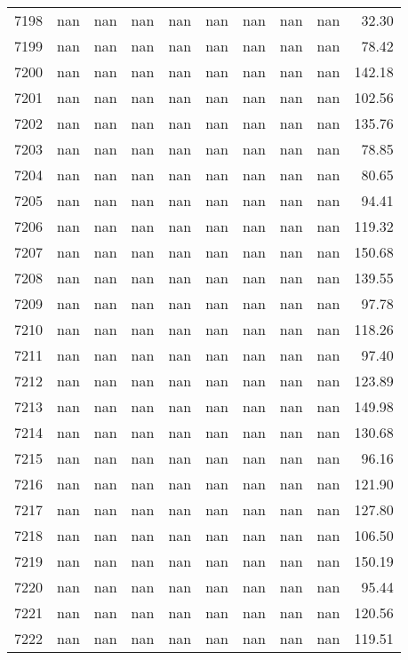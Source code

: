\begin{tabular}{lrrrrrrrrr}
7198 & nan & nan & nan & nan & nan & nan & nan & nan & 32.30 \\
7199 & nan & nan & nan & nan & nan & nan & nan & nan & 78.42 \\
7200 & nan & nan & nan & nan & nan & nan & nan & nan & 142.18 \\
7201 & nan & nan & nan & nan & nan & nan & nan & nan & 102.56 \\
7202 & nan & nan & nan & nan & nan & nan & nan & nan & 135.76 \\
7203 & nan & nan & nan & nan & nan & nan & nan & nan & 78.85 \\
7204 & nan & nan & nan & nan & nan & nan & nan & nan & 80.65 \\
7205 & nan & nan & nan & nan & nan & nan & nan & nan & 94.41 \\
7206 & nan & nan & nan & nan & nan & nan & nan & nan & 119.32 \\
7207 & nan & nan & nan & nan & nan & nan & nan & nan & 150.68 \\
7208 & nan & nan & nan & nan & nan & nan & nan & nan & 139.55 \\
7209 & nan & nan & nan & nan & nan & nan & nan & nan & 97.78 \\
7210 & nan & nan & nan & nan & nan & nan & nan & nan & 118.26 \\
7211 & nan & nan & nan & nan & nan & nan & nan & nan & 97.40 \\
7212 & nan & nan & nan & nan & nan & nan & nan & nan & 123.89 \\
7213 & nan & nan & nan & nan & nan & nan & nan & nan & 149.98 \\
7214 & nan & nan & nan & nan & nan & nan & nan & nan & 130.68 \\
7215 & nan & nan & nan & nan & nan & nan & nan & nan & 96.16 \\
7216 & nan & nan & nan & nan & nan & nan & nan & nan & 121.90 \\
7217 & nan & nan & nan & nan & nan & nan & nan & nan & 127.80 \\
7218 & nan & nan & nan & nan & nan & nan & nan & nan & 106.50 \\
7219 & nan & nan & nan & nan & nan & nan & nan & nan & 150.19 \\
7220 & nan & nan & nan & nan & nan & nan & nan & nan & 95.44 \\
7221 & nan & nan & nan & nan & nan & nan & nan & nan & 120.56 \\
7222 & nan & nan & nan & nan & nan & nan & nan & nan & 119.51 \\

\end{tabular}
